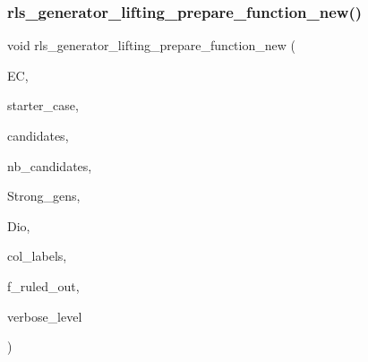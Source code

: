 \subsubsection{\texorpdfstring{rls\+\_\+generator\+\_\+lifting\+\_\+prepare\+\_\+function\+\_\+new()}{rls\_generator\_lifting\_prepare\_function\_new()}}
{\footnotesize\ttfamily void rls\+\_\+generator\+\_\+lifting\+\_\+prepare\+\_\+function\+\_\+new (\begin{DoxyParamCaption}\item[{\mbox{\hyperlink{classexact__cover}{exact\+\_\+cover}} $\ast$}]{EC,  }\item[{\mbox{\hyperlink{galois_8h_a09fddde158a3a20bd2dcadb609de11dc}{I\+NT}}}]{starter\+\_\+case,  }\item[{\mbox{\hyperlink{galois_8h_a09fddde158a3a20bd2dcadb609de11dc}{I\+NT}} $\ast$}]{candidates,  }\item[{\mbox{\hyperlink{galois_8h_a09fddde158a3a20bd2dcadb609de11dc}{I\+NT}}}]{nb\+\_\+candidates,  }\item[{\mbox{\hyperlink{classstrong__generators}{strong\+\_\+generators}} $\ast$}]{Strong\+\_\+gens,  }\item[{\mbox{\hyperlink{classdiophant}{diophant}} $\ast$\&}]{Dio,  }\item[{\mbox{\hyperlink{galois_8h_a09fddde158a3a20bd2dcadb609de11dc}{I\+NT}} $\ast$\&}]{col\+\_\+labels,  }\item[{\mbox{\hyperlink{galois_8h_a09fddde158a3a20bd2dcadb609de11dc}{I\+NT}} \&}]{f\+\_\+ruled\+\_\+out,  }\item[{\mbox{\hyperlink{galois_8h_a09fddde158a3a20bd2dcadb609de11dc}{I\+NT}}}]{verbose\+\_\+level }\end{DoxyParamCaption})}

